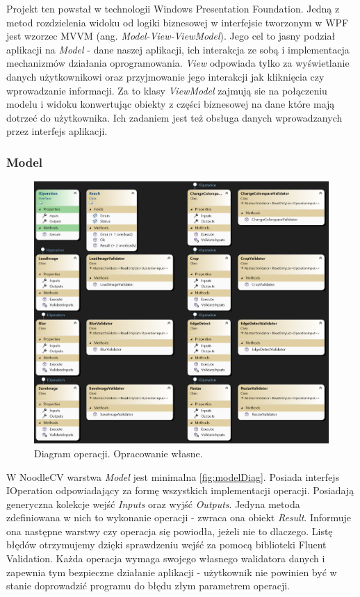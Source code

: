 
Projekt ten powstał w technologii Windows Presentation Foundation. 
Jedną z metod rozdzielenia widoku od logiki biznesowej w interfejsie tworzonym w WPF jest wzorzec MVVM (ang. \textit{Model-View-ViewModel}). 
Jego cel to jasny podział aplikacji na \textit{Model} - dane naszej aplikacji, ich interakcja ze sobą i implementacja mechanizmów działania oprogramowania. 
\textit{View} odpowiada tylko za wyświetlanie danych użytkownikowi oraz przyjmowanie jego interakcji jak kliknięcia czy wprowadzanie informacji. 
Za to klasy \textit{ViewModel} zajmują sie na połączeniu modelu i widoku konwertując obiekty z części biznesowej na dane które mają dotrzeć do użytkownika. 
Ich zadaniem jest też obsługa danych wprowadzanych przez interfejs aplikacji.

\subsubsection{Model}

\begin{figure}[H]
    \centering
    \includegraphics[width=1\linewidth]{images/Picture11.png}
    \caption{Diagram operacji. Opracowanie własne.}
    \label{fig:modelDiag}
\end{figure}

W NoodleCV warstwa \textit{Model} jest minimalna \autoref{fig:modelDiag}. 
Posiada interfejs IOperation odpowiadający za formę wszystkich implementacji operacji. 
Posiadają generyczna kolekcje wejść \textit{Inputs} oraz wyjść \textit{Outputs}.
Jedyna metoda zdefiniowana w nich to wykonanie operacji - zwraca ona obiekt \textit{Result}.
Informuje ona następne warstwy czy operacja się powiodła, jeżeli nie to dlaczego. 
Listę błędów otrzymujemy dzięki sprawdzeniu wejść za pomocą biblioteki Fluent Validation. 
Każda operacja wymaga swojego własnego walidatora danych i zapewnia tym bezpieczne działanie aplikacji - użytkownik nie powinien być w stanie doprowadzić programu do błędu złym parametrem operacji.


